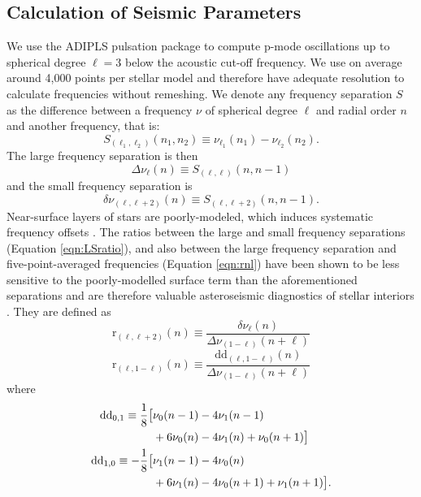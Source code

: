 \documentclass[twocolumn,twocolappendix]{aastex6}
\begin{document}
\subsection{Calculation of Seismic Parameters}
\label{sec:seis}
We use the ADIPLS pulsation package \citep{2008Ap&SS.316..113C} to compute p-mode oscillations up to spherical degree $\ell=3$ below the acoustic cut-off frequency. We use on average around 4,000 points per stellar model and therefore have adequate resolution to calculate frequencies without remeshing. We denote any frequency separation $S$ as the difference between a frequency $\nu$ of spherical degree $\ell$ and radial order $n$ and another frequency, that is: 
\begin{equation} 
  S_{(\ell_1, \ell_2)}(n_1, n_2) \equiv \nu_{\ell_1}(n_1) - \nu_{\ell_2}(n_2).
\end{equation}
The large frequency separation is then
\begin{equation} 
  \Delta\nu_\ell(n) \equiv S_{(\ell, \ell)}(n, n-1)
\end{equation}
and the small frequency separation is
\begin{equation}
  \delta\nu_{(\ell, \ell+2)}(n) \equiv S_{(\ell, \ell+2)}(n, n-1).
\end{equation}
Near-surface layers of stars are poorly-modeled, which induces systematic frequency offsets \citep[see e.g.][]{1999A&A...351..689R}. The ratios between the large and small frequency separations (Equation \ref{eqn:LSratio}), and also between the large frequency separation and five-point-averaged frequencies (Equation \ref{eqn:rnl}) have been shown to be less sensitive to the poorly-modelled surface term than the aforementioned separations and are therefore valuable asteroseismic diagnostics of stellar interiors \citep{2003A&A...411..215R}. They are defined as
\begin{equation} 
  \mathrm{r}_{(\ell,\ell+2)}(n) \equiv \frac{\delta\nu_\ell(n)}{\Delta\nu_{(1-\ell)}(n+\ell)} \label{eqn:LSratio}
\end{equation}
\begin{equation} 
  \mathrm{r}_{(\ell, 1-\ell)}(n) \equiv \frac{\mathrm{dd}_{(\ell,1-\ell)}(n)}{\Delta\nu_{(1-\ell)}(n+\ell)} \label{eqn:rnl}
\end{equation}
where
\begin{align} 
  \mathrm{dd}_{0,1} \equiv \frac{1}{8} \big[&\nu_0(n-1) - 4\nu_1(n-1) \notag\\
                                 &+6\nu_0(n) - 4\nu_1(n) + \nu_0(n+1)\big]\\ 
  \mathrm{dd}_{1,0} \equiv -\frac{1}{8} \big[&\nu_1(n-1) - 4\nu_0(n) \notag\\
                                 &+6\nu_1(n) - 4\nu_0(n+1) + \nu_1(n+1)\big].
\end{align}
\end{document}
